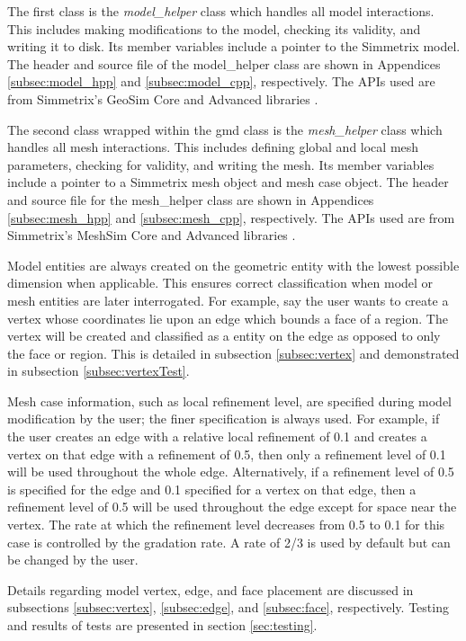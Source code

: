 \documentclass[a4paper, 12pt]{article}
\begin{document}
The first class is the \emph{model\_helper} class 
which handles all model interactions. This includes making modifications to
the model, checking its validity, and writing it to disk. 
Its member variables
include a pointer to the Simmetrix model. The header and source file of the 
model\_helper class are shown in Appendices \ref{subsec:model_hpp} and 
\ref{subsec:model_cpp}, respectively. The APIs used are from Simmetrix's 
GeoSim Core and Advanced libraries \cite{Simmetrix}. 

The second class wrapped within the gmd class is the
\emph{mesh\_helper} class which handles all mesh interactions. This includes
defining global and local mesh parameters, checking for validity, 
and writing the mesh. 
Its member variables include a pointer to a Simmetrix mesh object 
and mesh case object. 
The header and source file for the mesh\_helper class are shown in 
Appendices \ref{subsec:mesh_hpp} and \ref{subsec:mesh_cpp}, respectively.
The APIs used are from Simmetrix's MeshSim Core and Advanced libraries 
\cite{Simmetrix}.

Model entities are always created on the geometric entity with the
lowest possible dimension when applicable. This ensures 
correct classification when model
or mesh entities are later interrogated. For example, say the
user wants to create a vertex whose coordinates lie upon an edge
which bounds a face of a region. The vertex will be created and 
classified as a entity on the edge as opposed to only the face or region. 
This is detailed in subsection \ref{subsec:vertex} and  demonstrated 
in subsection \ref{subsec:vertexTest}.

Mesh case information, such as local refinement level, are
specified during model modification by the user; the finer
specification is always used. For example, if the user 
creates an edge with a relative local refinement of 0.1
and creates a vertex on that edge with a refinement of 0.5, 
then only a refinement level of 0.1 will be used throughout 
the whole edge. Alternatively, if a refinement level of 0.5 
is specified for the edge and 0.1 specified for a vertex on that
edge, then a refinement level of 0.5 will be used throughout the 
edge except for space near the vertex. The rate at which the 
refinement level decreases from 0.5 to 0.1 for this case is controlled
by the gradation rate. A rate of 2/3 is used by default 
but can be changed by the user. 

Details regarding model vertex, edge, and face placement are 
discussed in subsections \ref{subsec:vertex}, \ref{subsec:edge}, 
and \ref{subsec:face}, respectively. Testing and results of tests
are presented in section \ref{sec:testing}.
\end{document}
